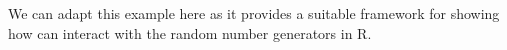 We can adapt this example here as it provides a suitable framework for
showing how  can interact with the random number generators
in R. 





\address{Dirk Eddelbuettel \\
  River Forest, IL\\
  USA}\\

\address{Renaud Gaujoux \\
  Computational Biology \\
  University of Cape Town \\
  Cape Town \\
  South Africa}\\


